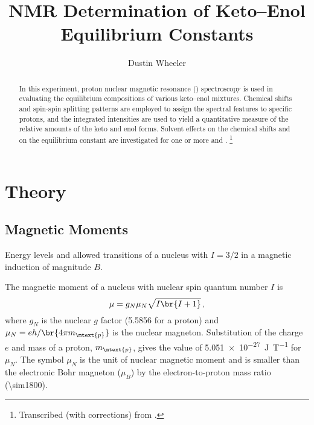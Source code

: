 \documentclass[nobib,nofonts,nols,nohyper]{tufte-handout}
\title{NMR Determination of Keto--Enol Equilibrium Constants}
\author{Dustin Wheeler}
\begin{document}
\maketitle%

\begin{abstract}
\noindent
In this experiment, proton nuclear magnetic resonance (\NMR*) spectroscopy is used in evaluating the equilibrium compositions of various keto--enol mixtures. 
Chemical shifts and spin-spin splitting patterns are employed to assign the spectral features to specific protons, and the integrated intensities are used to yield a quantitative measure of the relative amounts of the keto and enol forms. 
Solvent effects on the chemical shifts and on the equilibrium constant are investigated for one or more  and . 
\thanks{Transcribed (with corrections) from \textcite{nibler14}.}
\end{abstract}


\section{Theory} %
\label{sec:theory}

\subsection{Magnetic Moments} %
\label{sub:magnetic_moments}

\begin{marginfigure}
  \centering
   
  \caption{Energy levels and allowed transitions of a nucleus with \( I = 3/2 \) in a magnetic induction of magnitude \( B \).}
  \label{fig:quad_splitting}
\end{marginfigure}
The magnetic moment of a nucleus with nuclear spin quantum number \( I \) is 
\begin{equation}
	\mu = g_N \mu_N \sqrt{I \br{I+1}} \, ,
	\label{eq:mag_mom}
\end{equation}
where \( g_N \) is the nuclear \( g \) factor (\num{5.5856} for a proton) and \( \mu_N = e h / \br{4 \pi m_\mtext{p}} \) is the nuclear magneton.
Substitution of the charge \( e \) and mass of a proton, \( m_\mtext{p} \), gives the value of \SI{5.051e-27}{\joule\per\tesla} for \( \mu_N \). 
The symbol \( \mu_N \) is the unit of nuclear magnetic moment and is smaller than the electronic Bohr magneton (\( \mu_B \)) by the electron-to-proton mass ratio (\num{\sim1800}). 
\end{document}
